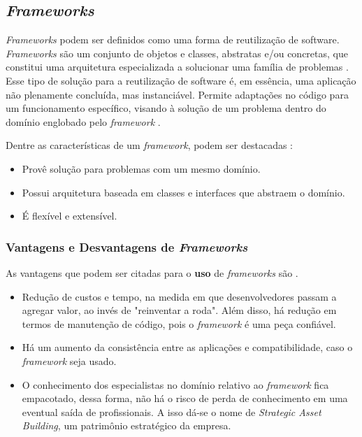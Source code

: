 \subsection{\textit{Frameworks}}
\textit{Frameworks} podem ser definidos como uma forma de reutilização de software. \textit{Frameworks} são um conjunto de objetos e classes, abstratas e/ou concretas, que constitui uma arquitetura especializada a solucionar uma família de problemas \cite{barretoJunior2006}. Esse tipo de solução para a reutilização de software é, em essência, uma aplicação não plenamente concluída, mas instanciável. Permite adaptações no código para um funcionamento específico, visando à solução de um problema dentro do domínio englobado pelo \textit{framework} \cite{barretoJunior2006}.
\par
\indent Dentre as características de um \textit{framework}, podem ser destacadas \cite{sauve2006}:
\begin{itemize}
\item Provê solução para problemas com um mesmo domínio.
\item Possui arquitetura baseada em classes e interfaces que abstraem o domínio.
\item É flexível e extensível.
\end{itemize}
\par
\subsubsection{Vantagens e Desvantagens de \textit{Frameworks}}
As vantagens que podem ser citadas para o \textbf{uso} de \textit{frameworks} são \cite{barretoJunior2006} \cite{sauve2006}.
\begin{itemize}
\item Redução de custos e tempo, na medida em que desenvolvedores passam a agregar valor, ao invés de "reinventar a roda". Além disso, há redução em termos de manutenção de código, pois o \textit{framework} é uma peça confiável.
\item Há um aumento da consistência entre as aplicações e compatibilidade, caso o \textit{framework} seja usado.
\item O conhecimento dos especialistas no domínio relativo ao \textit{framework} fica empacotado, dessa forma, não há o risco de perda de conhecimento em uma eventual saída de profissionais. A isso dá-se o nome de \textit{Strategic Asset Building}, um patrimônio estratégico da empresa.
\end{itemize}


